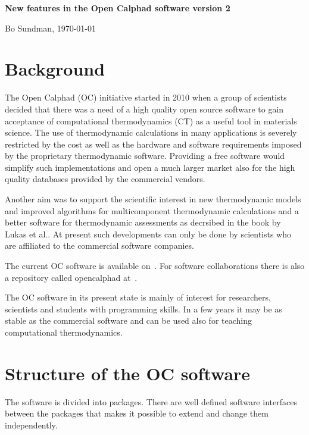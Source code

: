 \documentclass[12pt]{article}
\begin{document}
{\bf \Large New features in the Open Calphad software version 2}

\bigskip

Bo Sundman, \today

\section{Background}

The Open Calphad (OC) initiative started in 2010 when a group of
scientists decided that there was a need of a high quality open source
software to gain acceptance of computational thermodynamics (CT) as a
useful tool in materials science.  The use of thermodynamic
calculations in many applications is severely restricted by the cost
as well as the hardware and software requirements imposed by the
proprietary thermodynamic software.  Providing a free software would
simplify such implementations and open a much larger market also for
the high quality databases provided by the commercial vendors.

Another aim was to support the scientific interest in new
thermodynamic models and improved algorithms for multicomponent
thermodynamic calculations and a better software for thermodynamic
assessments as decrsibed in the book by Lukas et al.\cite{07Luk}.  At
present such developments can only be done by scientists who are
affiliated to the commercial software companies.

The current OC software is available on~\cite{ocweb}.  For software
collaborations there is also a repository called opencalphad
at~\cite{github}.

The OC software in its present state is mainly of interest for
researchers, scientists and students with programming skills.  In a
few years it may be as stable as the commercial software and can be
used also for teaching computational thermodynamics.

\section{Structure of the OC software}

The software is divided into packages.  There are well defined
software interfaces between the packages that makes it possible to
extend and change them independently.
\end{document}
